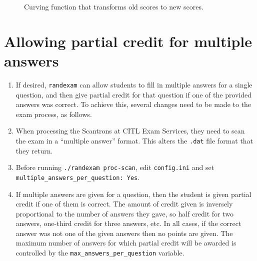 \documentclass{article}
\begin{document}
\begin{figure}
  \centering
  \caption{Curving function that transforms old scores to new scores.}
  \label{fig:curve}
\end{figure}

\section{Allowing partial credit for multiple answers}

\begin{enumerate}
\item If desired, \texttt{randexam} can allow students to fill in
  multiple answers for a single question, and then give partial credit
  for that question if one of the provided answers was correct. To
  achieve this, several changes need to be made to the exam process,
  as follows.
\item When processing the Scantrons at CITL Exam Services, they need
  to scan the exam in a ``multiple answer'' format. This alters the
  \texttt{.dat} file format that they return.
\item Before running \texttt{./randexam proc-scan}, edit
  \texttt{config.ini} and set \texttt{multiple_answers_per_question:
    Yes}.
\item If multiple answers are given for a question, then the student
  is given partial credit if one of them is correct. The amount of
  credit given is inversely proportional to the number of answers they
  gave, so half credit for two answers, one-third credit for three
  answers, etc. In all cases, if the correct answer was not one of the
  given answers then no points are given. The maximum number of
  answers for which partial credit will be awarded is controlled by
  the \texttt{max_answers_per_question} variable.
\end{enumerate}
\end{document}
